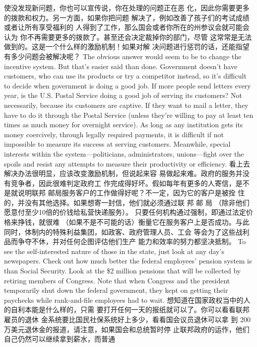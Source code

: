 \begin{paracol}{2}
使没发现新问题，你也可以宣传说，你在处理的问题正在恶
化，因此你需要更多的拨款和权力。另一方面，如果你把问题
解决了，例如改善了孩子们的考试成绩或者让所有享受福利的
人得到了工作，那么国会或者你所在的州参议会就可能会认为
你不再需要更多的拨款了。甚至还会决定裁掉你的部门，尽管
这常常是无法做到的。这是一个什么样的激励机制！如果对解
决问题进行惩罚的话，还能指望有多少问题会被解决呢？
\switchcolumn*
The obvious answer would seem to be to change the incentive
system. But that's easier said than done. Government doesn't
have customers, who can use its products or try a competitor instead, so it's difficult to decide when government is doing a
good job. If more people send letters every year, is the U.S.
Postal Service doing a good job of serving its customers? Not
necessarily, because its customers are captive. If they want to
mail a letter, they have to do it through the Postal Service (unless they're willing to pay at least ten times as much money for
overnight service). As long as any institution gets its money coercively, through legally required payments, it is difficult if not
impossible to measure its success at serving customers. Meanwhile, special interests within the system---politicians, administrators, unions---fight over the spoils and resist any attempts to
measure their productivity or efficiency.
\switchcolumn
看上去解决办法很明显，应该改变激励机制，但说起来容
易做起来难。政府的服务并没有竞争者，因此很难判定政府工
作完成得好坏。假如每年有更多的人寄信，是不是就说明联邦
邮局服务客户的工作做得好呢？不一定，因为它的客户是被拴
住的，并没有其他选择。如果想寄一封信，他们就必须通过联
邦 邮 局 （除非他们愿意付至少10倍的价钱给私营快递服务）。
只要任何机构通过强制，即通过法定价格来挣钱，就很难
（如果不是不可能的话）衡量它在服务客户上是否成功。与此同时，体制内的特殊利益集团，如政客、政府管理人员、工会
等会为了这些战利品而争夺不休，并对任何企图评估他们生产
能力和效率的努力都坚决抵制。
\switchcolumn*
To see the self-interested nature of those in the state, just look
at any day's newspapers. Check out how much better the federal
employees' pension system is than Social Security. Look at the \$2
million pensions that will be collected by retiring members of
Congress. Note that when Congress and the president temporarily shut down the federal government, they kept on getting their paychecks while rank-and-file employees had to wait.
\switchcolumn
想知道在国家政权当中的人的自利本能是什么样的，只需
要打开任何一天的报纸就可以了。你可以看看联邦雇员的退休
金系统要比国民社保系统好上多少，看看国会议员退休可以拿
到 200万美元退休金的报道，请注意，如果国会和总统暂时停
止联邦政府的运作，他们自己仍然可以继续拿到薪水，而普通

\end{paracol}
